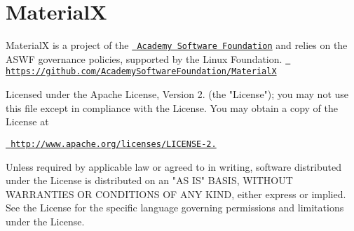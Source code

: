 \chapter{MaterialX}
\hypertarget{md_node__modules_2three_2examples_2jsm_2nodes_2materialx_2_d_i_s_c_l_a_i_m_e_r}{}\label{md_node__modules_2three_2examples_2jsm_2nodes_2materialx_2_d_i_s_c_l_a_i_m_e_r}
\label{md_node__modules_2three_2examples_2jsm_2nodes_2materialx_2_d_i_s_c_l_a_i_m_e_r_autotoc_md32809}%
%


MaterialX is a project of the \href{https://www.aswf.io/}{\texttt{ Academy Software Foundation}} and relies on the ASWF governance policies, supported by the Linux Foundation. \href{https://github.com/AcademySoftwareFoundation/MaterialX}{\texttt{ https\+://github.\+com/\+Academy\+Software\+Foundation/\+MaterialX}}

Licensed under the Apache License, Version 2. (the "{}\+License"{}); you may not use this file except in compliance with the License. You may obtain a copy of the License at

\href{http://www.apache.org/licenses/LICENSE-2.0}{\texttt{ http\+://www.\+apache.\+org/licenses/\+LICENSE-\/2.}}

Unless required by applicable law or agreed to in writing, software distributed under the License is distributed on an "{}\+AS IS"{} BASIS, WITHOUT WARRANTIES OR CONDITIONS OF ANY KIND, either express or implied. See the License for the specific language governing permissions and limitations under the License.


